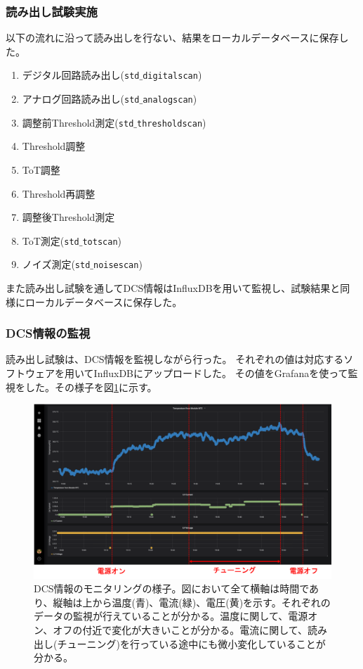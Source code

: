 
\clearpage
\subsubsection{読み出し試験実施}
以下の流れに沿って読み出しを行ない、結果をローカルデータベースに保存した。
\begin{enumerate}
  \item デジタル回路読み出し(\texttt{std$\_$digitalscan})
  \item アナログ回路読み出し(\texttt{std$\_$analogscan})
  \item 調整前Threshold測定(\texttt{std$\_$thresholdscan})
  \item Threshold調整
  \item ToT調整
  \item Threshold再調整
  \item 調整後Threshold測定
  \item ToT測定(\texttt{std$\_$totscan})
  \item ノイズ測定(\texttt{std$\_$noisescan})
\end{enumerate}

また読み出し試験を通してDCS情報はInfluxDBを用いて監視し、試験結果と同様にローカルデータベースに保存した。

\subsubsection{DCS情報の監視}
読み出し試験は、DCS情報を監視しながら行った。
それぞれの値は対応するソフトウェアを用いてInfluxDBにアップロードした。
その値をGrafanaを使って監視をした。その様子を図\ref{demo_monitor_dcs}に示す。

\begin{figure}[bpt]\centering
\includegraphics[width=12cm]{demo_monitor_dcs}
\caption[DCS情報のモニタリングの様子]{DCS情報のモニタリングの様子。図において全て横軸は時間であり、縦軸は上から温度(青)、電流(緑)、電圧(黄)を示す。それぞれのデータの監視が行えていることが分かる。温度に関して、電源オン、オフの付近で変化が大きいことが分かる。電流に関して、読み出し(チューニング)を行っている途中にも微小変化していることが分かる。}
\label{demo_monitor_dcs}
\end{figure}

